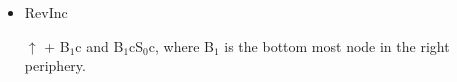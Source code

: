 \documentclass[10pt]{beamer}
\begin{document}
\begin{frame}
\begin{itemize}
\begin{center}
\begin{table}
\begin{tabularx}{0.95\textwidth}{C{10pt}R{250pt}}
                        S${}_0$cQ${}_0$pQ${}_1$p,
                        S${}_0$pQ${}_0$pQ${}_1$p,
                        S${}_0$wcS${}_1$cS${}_2$c,
                        S${}_0$cS${}_1$wcS${}_2$c,
                        S${}_0$cS${}_1$cS${}_2$wc,
                        S${}_0$cS${}_1$cS${}_2$,
                        S${}_0$pS${}_1$pS${}_2$, \\
                         & S${}_0$cS${}_0$HcS${}_0$Lc,
                        S${}_0$cS${}_0$HcS${}_0$Rc,
                        S${}_1$cS${}_1$HcS${}_1$Rc,
                        S${}_0$cS${}_0$RcQ${}_0$p,
                        S${}_0$cS${}_0$RcQ${}_0$w,
                        S${}_0$cS${}_0$LcS${}_1$c,
                        S${}_0$cS${}_0$LcS${}_1$w,
                        S${}_0$cS${}_1$cS${}_1$Rc,
                        S${}_0$wS${}_1$cS${}_1$Rc, \\
                        \bottomrule
                    \end{tabularx}
                \end{table}
            \end{center}

            \bigskip

        \item RevInc

            $\uparrow$ + B${}_1$c and B${}_1$cS${}_0$c, where B${}_1$ is the bottom most node in the right periphery.
    \end{itemize}
    \endgroup
\end{frame}
\end{document}
